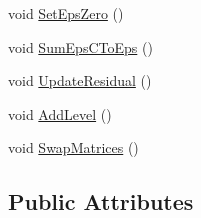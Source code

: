 \begin{DoxyCompactItemize}
\item 
void \mbox{\hyperlink{classfemus_1_1_linear_equation_a1beb93193b619ce9d6adae4977c2e993}{Set\+Eps\+Zero}} ()
\item 
void \mbox{\hyperlink{classfemus_1_1_linear_equation_ab6c32f709a8f531e108109faaf440fef}{Sum\+Eps\+C\+To\+Eps}} ()
\item 
void \mbox{\hyperlink{classfemus_1_1_linear_equation_adeac6aca70228a86f274b8589d464207}{Update\+Residual}} ()
\item 
void \mbox{\hyperlink{classfemus_1_1_linear_equation_a371874e189850ea153741747a5257343}{Add\+Level}} ()
\item 
void \mbox{\hyperlink{classfemus_1_1_linear_equation_a3aa325f74068742d2c4b235ee6578e69}{Swap\+Matrices}} ()
\end{DoxyCompactItemize}
\subsection*{Public Attributes}
